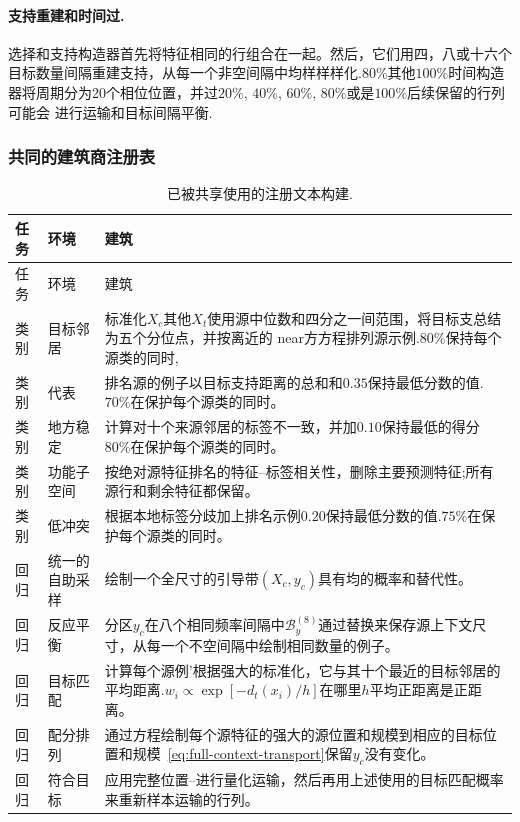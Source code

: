 \paragraph{支持重建和时间过.}选择和支持构造器首先将特征相同的行组合在一起。然后，它们用四，八或十六个目标数量间隔重建支持，从每一个非空间隔中均样样样化.$80\%$其他$100\%$时间构造器将周期分为20个相位位置，并过$20\%$, $40\%$, $60\%$, $80\%$或是$100\%$后续保留的行列可能会
进行运输和目标间隔平衡.

\subsubsection{共同的建筑商注册表}

\begingroup
  \scriptsize
  \setlength{\tabcolsep}{3pt}
  \renewcommand{\arraystretch}{1.04}
  \begin{longtable}{@{}>{\raggedright\arraybackslash}p{}
                         >{\raggedright\arraybackslash}p{}
                         >{\raggedright\arraybackslash}p{}@{}}
    \caption{已被共享使用的注册文本构建.}
    \label{tab:shared-context-bank}\\
    \toprule 任务&环境&建筑\\
    \midrule
    \endfirsthead
    \toprule 任务&环境&建筑\\
    \midrule
    \endhead
    \bottomrule
    \endfoot 类别&目标邻居&标准化$X_c$其他$X_t$使用源中位数和四分之一间范围，将目标支总结为五个分位点，并按离近的 near方方程排列源示例.$80\%$保持每个源类的同时,\\
类别&代表&排名源的例子以目标支持距离的总和和$0.35$保持最低分数的值.$70\%$在保护每个源类的同时。\\
类别&地方稳定&计算对十个来源邻居的标签不一致，并加$0.10$保持最低的得分$80\%$在保护每个源类的同时。\\
类别&功能子空间&按绝对源特征排名的特征--标签相关性，删除主要预测特征;所有源行和剩余特征都保留。\\
类别&低冲突&根据本地标签分歧加上排名示例$0.20$保持最低分数的值.$75\%$在保护每个源类的同时。\\
    \midrule 回归&统一的自助采样&绘制一个全尺寸的引导带$(X_c,y_c)$具有均的概率和替代性。\\
回归&反应平衡&分区$y_c$在八个相同频率间隔中$\mathcal B_y^{(8)}$通过替换来保存源上下文尺寸，从每一个不空间隔中绘制相同数量的例子。\\
回归&目标匹配&计算每个源例'根据强大的标准化，它与其十个最近的目标邻居的平均距离.$w_i\propto\exp[-d_t(x_i)/h]$在哪里$h$平均正距离是正距离。\\
回归&配分排列&通过方程绘制每个源特征的强大的源位置和规模到相应的目标位置和规模~\eqref{eq:full-context-transport}保留$y_c$没有变化。\\
回归&符合目标&应用完整位置--进行量化运输，然后再用上述使用的目标匹配概率来重新样本运输的行列。\\
\end{longtable}
\endgroup

